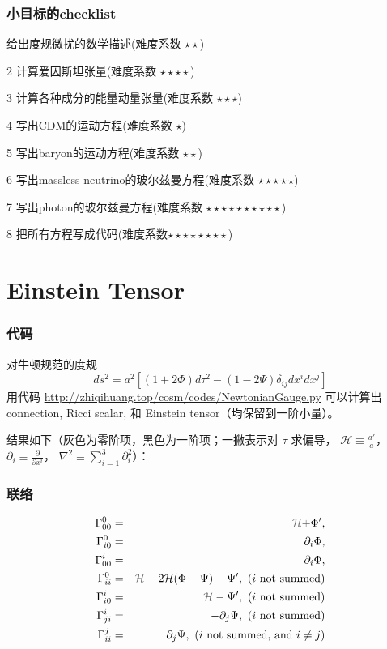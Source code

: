\documentclass[CJK,13pt]{beamer}
\begin{document}
  \begin{frame}
    \frametitle{小目标的checklist}
    \bitem
  \item[\checkmark]{给出度规微扰的数学描述(难度系数 $\star\star$)}
  \item[2]{计算爱因斯坦张量(难度系数 $\star\star\star\star$)}
  \item[3]{计算各种成分的能量动量张量(难度系数 $\star\star\star$)}    
  \item[4]{写出CDM的运动方程(难度系数 $\star$)}
  \item[5]{写出baryon的运动方程(难度系数 $\star\star$)}        
  \item[6]{写出massless neutrino的玻尔兹曼方程(难度系数 $\star\star\star\star\star$)}
  \item[7]{写出photon的玻尔兹曼方程(难度系数 $\star\star\star\star\star\star\star\star\star\star$)}
  \item[8]{把所有方程写成代码(难度系数$\star\star\star\star\star\star\star\star$)}
    \eitem
  \end{frame}

  
  \section{Einstein Tensor}

  \begin{frame}
    \frametitle{代码}
    对牛顿规范的度规
      {\blue $$ ds^2 = a^2\left[\left(1+2\Phi\right)d\tau^2 - \left(1-2\Psi\right)\delta_{ij}dx^idx^j\right]$$}    
      用代码
    \url{http://zhiqihuang.top/cosm/codes/NewtonianGauge.py}
    可以计算出connection, Ricci scalar, 和 Einstein tensor（均保留到一阶小量）。

    \skipline

    结果如下（灰色为零阶项，黑色为一阶项；一撇表示对 $\tau$ 求偏导， $\mathcal{H}\equiv\frac{a'}{a}$， $\partial_i\equiv \frac{\partial}{\partial x^i}$， $\nabla^2\equiv \sum_{i=1}^3 \partial_i^2$）：
  \end{frame}

  \begin{frame}
    \frametitle{联络}
     \begin{eqnarray}
\Gamma^{0}_{00} &=&{\gray \mathcal{H} + } \Phi',   \\
\Gamma^{0}_{i0} &=&  {\partial_i} \Phi,   \\
\Gamma^{i}_{00} &=&  {\partial_i} \Phi,   \\
\Gamma^{0}_{ii} &=& {\gray \mathcal{H} }- 2 \mathcal{H}(\Phi +\Psi) - \Psi'  ,\ \text{($i$ not summed)} \\
\Gamma^{i}_{i0} &=& {\gray \mathcal{H} }  -  \Psi' ,\ \text{($i$ not summed)} \\
\Gamma^{i}_{ji} &=& -  {\partial_j} \Psi ,\ \text{($i$ not summed)} \\
\Gamma^{j}_{ii} &=&  {\partial_j} \Psi  ,\ \text{($i$ not summed, and $i\ne j$)} 
\end{eqnarray}
  \end{frame}
  
\end{document}
